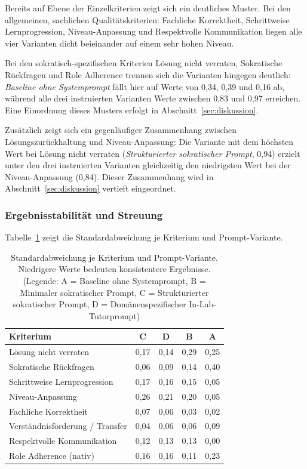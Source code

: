 Bereits auf Ebene der Einzelkriterien zeigt sich ein deutliches Muster. Bei den allgemeinen,
sachlichen Qualitätskriterien: Fachliche Korrektheit, Schrittweise Lernprogression,
Niveau-Anpassung und Respektvolle Kommunikation liegen alle vier Varianten dicht beieinander auf
einem sehr hohen Niveau.

Bei den sokratisch-spezifischen Kriterien \glqq Lösung nicht verraten\grqq{}, \glqq Sokratische
Rückfragen\grqq{} und Role Adherence trennen sich die Varianten hingegen deutlich: \emph{Baseline
ohne Systemprompt} fällt hier auf Werte von 0,34, 0,39 und 0,16 ab, während alle drei instruierten
Varianten Werte zwischen 0,83 und 0,97 erreichen. Eine Einordnung dieses Musters erfolgt in
Abschnitt~\ref{sec:diskussion}.

Zusätzlich zeigt sich ein gegenläufiger Zusammenhang zwischen Lösungszurückhaltung und
Niveau-Anpassung: Die Variante mit dem höchsten Wert bei \glqq Lösung nicht verraten\grqq{}
(\emph{Strukturierter sokratischer Prompt}, 0,94) erzielt unter den drei instruierten Varianten
gleichzeitig den niedrigsten Wert bei der Niveau-Anpassung (0,84). Dieser Zusammenhang wird in
Abschnitt~\ref{sec:diskussion} vertieft eingeordnet.

\subsubsection{Ergebnisstabilität und Streuung}

Tabelle~\ref{tab:rq1-streuung} zeigt die Standardabweichung je Kriterium und Prompt-Variante.

\begin{table}[htbp]
\centering
\small
\caption{Standardabweichung je Kriterium und Prompt-Variante. Niedrigere Werte bedeuten konsistentere Ergebnisse. (Legende: A = Baseline ohne Systemprompt, B = Minimaler sokratischer Prompt, C = Strukturierter sokratischer Prompt, D = Domänenspezifischer In-Lab-Tutorprompt)}
\label{tab:rq1-streuung}
\begin{tabular}{lcccc}
\toprule
\textbf{Kriterium} & \textbf{C} & \textbf{D} & \textbf{B} & \textbf{A} \\
\midrule
Lösung nicht verraten           & 0,17 & 0,14 & 0,29 & 0,25 \\
Sokratische Rückfragen          & 0,06 & 0,09 & 0,14 & 0,40 \\
Schrittweise Lernprogression    & 0,17 & 0,16 & 0,15 & 0,05 \\
Niveau-Anpassung                & 0,26 & 0,21 & 0,20 & 0,05 \\
Fachliche Korrektheit           & 0,07 & 0,06 & 0,03 & 0,02 \\
Verständnisförderung / Transfer & 0,04 & 0,06 & 0,06 & 0,09 \\
Respektvolle Kommunikation      & 0,12 & 0,13 & 0,13 & 0,00 \\
Role Adherence (nativ)          & 0,16 & 0,16 & 0,11 & 0,23 \\
\bottomrule
\end{tabular}
\end{table}

